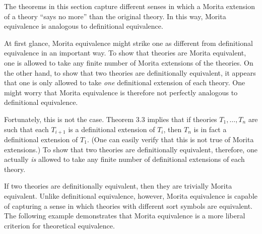 The theorems in this section capture different senses in which a
Morita extension of a theory ``says no more'' than the original
theory. In this way, Morita equivalence is analogous to definitional
equivalence.

At first glance, Morita equivalence might strike one as different from
definitional equivalence in an important way. To show that theories
are Morita equivalent, one is allowed to take any finite number of
Morita extensions of the theories. On the other hand, to show that two
theories are definitionally equivalent, it appears that one is only
allowed to take \textit{one} definitional extension of each
theory. One might worry that Morita equivalence is therefore not
perfectly analogous to definitional equivalence.

Fortunately, this is not the case. Theorem 3.3 implies that if
theories $T_1, \ldots, T_n$ are such that each $T_{i+1}$ is a
definitional extension of $T_i$, then $T_n$ is in fact a definitional
extension of $T_1$. (One can easily verify that this is not true of
Morita extensions.) To show that two theories are definitionally
equivalent, therefore, one actually \textit{is} allowed to take any
finite number of definitional extensions of each theory.

If two theories are definitionally equivalent, then they are trivially
Morita equivalent. Unlike definitional equivalence, however, Morita
equivalence is capable of capturing a sense in which theories with
different sort symbols are equivalent.  The following example
demonstrates that Morita equivalence is a more liberal criterion for
theoretical equivalence.

